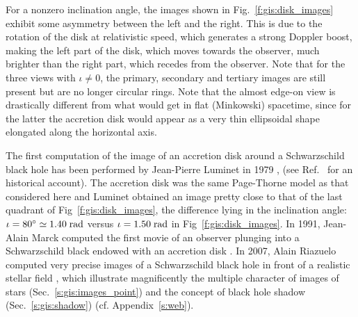 For a nonzero inclination angle, the images shown in Fig.~\ref{f:gis:disk_images}
exhibit some asymmetry between the left and the right. This is due to the
rotation of the disk at relativistic speed, which generates a strong Doppler
boost, making the left part of the disk, which moves towards the observer,
much brighter than the right part, which recedes from the observer.
Note that for the three views with $\iota\not=0$, the primary, secondary and
tertiary images are still present but are no longer circular rings.
Note that the almost edge-on view is drastically different from what would
get in flat (Minkowski) spacetime, since for the latter the accretion disk
would appear as a very thin ellipsoidal shape elongated along the
horizontal axis.

\begin{hist} \label{h:gis:bh_images}
The first computation of the image of an accretion disk around a Schwarzschild black hole
has been performed by
Jean-Pierre Luminet in 1979 \cite{Lumin79}, (see Ref.~\cite{Lumin19} for
an historical account). The accretion disk was the same Page-Thorne model
as that considered here and Luminet obtained an image pretty close
to that of the last quadrant of Fig~\ref{f:gis:disk_images}, the difference
lying in the inclination angle: $\iota = 80^\circ \simeq 1.40 {\rm\; rad}$
versus $\iota = 1.50 {\rm\; rad}$ in Fig~\ref{f:gis:disk_images}.
In 1991, Jean-Alain Marck computed the first movie of an observer plunging
into a Schwarzschild black endowed with an accretion disk \cite{Marck91,Marck96}.
In 2007, Alain Riazuelo computed very precise images of a
Schwarzschild black hole in front of a realistic stellar field \cite{Riazu08,Riazu19},
which illustrate magnificently the multiple character of images of stars (Sec.~\ref{s:gis:images_point})
and the concept of black hole shadow (Sec.~\ref{s:gis:shadow})
(cf. Appendix~\ref{s:web}).
\end{hist}




